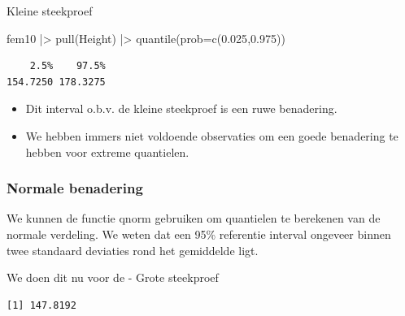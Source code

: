 \documentclass[
  dutch,
  letterpaper,
  12pt]{book}
\newenvironment{Shaded}{\begin{snugshade}}{\end{snugshade}}
\newcommand{\AttributeTok}[1]{\textcolor[rgb]{0.40,0.45,0.13}{#1}}
\newcommand{\DecValTok}[1]{\textcolor[rgb]{0.68,0.00,0.00}{#1}}
\newcommand{\FloatTok}[1]{\textcolor[rgb]{0.68,0.00,0.00}{#1}}
\newcommand{\FunctionTok}[1]{\textcolor[rgb]{0.28,0.35,0.67}{#1}}
\newcommand{\NormalTok}[1]{\textcolor[rgb]{0.00,0.23,0.31}{#1}}
\newcommand{\SpecialCharTok}[1]{\textcolor[rgb]{0.37,0.37,0.37}{#1}}
\providecommand{\tightlist}{%
  \setlength{\itemsep}{0pt}\setlength{\parskip}{0pt}}
\theoremstyle{definition}
\theoremstyle{definition}
\theoremstyle{definition}
\theoremstyle{remark}
\begin{document}
Kleine steekproef

\begin{Shaded}
\begin{Highlighting}[]
\NormalTok{fem10 }\SpecialCharTok{|\textgreater{}}
  \FunctionTok{pull}\NormalTok{(Height) }\SpecialCharTok{|\textgreater{}}
  \FunctionTok{quantile}\NormalTok{(}\AttributeTok{prob=}\FunctionTok{c}\NormalTok{(}\FloatTok{0.025}\NormalTok{,}\FloatTok{0.975}\NormalTok{))}
\end{Highlighting}
\end{Shaded}

\begin{verbatim}
    2.5%    97.5% 
154.7250 178.3275 
\end{verbatim}

\begin{itemize}
\tightlist
\item
  Dit interval o.b.v. de kleine steekproef is een ruwe benadering.
\item
  We hebben immers niet voldoende observaties om een goede benadering te
  hebben voor extreme quantielen.
\end{itemize}

\subsubsection{Normale benadering}\label{normale-benadering-1}

We kunnen de functie qnorm gebruiken om quantielen te berekenen van de
normale verdeling. We weten dat een 95\% referentie interval ongeveer
binnen twee standaard deviaties rond het gemiddelde ligt.

We doen dit nu voor de - Grote steekproef

\begin{Shaded}
\end{Shaded}

\begin{verbatim}
[1] 147.8192
\end{verbatim}

\begin{Shaded}
\end{Shaded}
\end{document}
